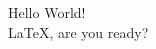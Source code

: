 \documentclass[12pt]{article}
\begin{document}
\begin{center}

Hello World!\\
\LaTeX{}, are you ready?

\end{center}
\end{document}
